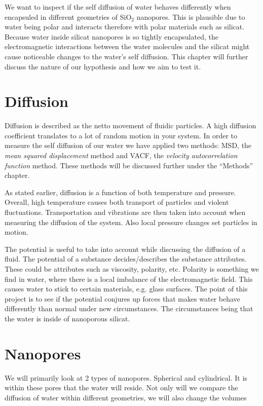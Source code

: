 \documentclass[10pt, a4paper]{report}
\begin{document}
We want to inspect if the self diffusion of water behaves differently
when encapsuled in different geometries of SiO$_2$ nanopores. This is plausible due to water being polar and interacts therefore with polar materials such as silicat. 
Because water inside silicat nanopores is so tightly encapsulated, the electromagnetic interactions between the water 
molecules and the silicat might cause noticeable changes to the water's self diffusion.
This chapter will further discuss the nature of our hypothesis and how we aim to test it.

\section{Diffusion}
Diffusion is described as the netto movement of fluidic particles. A high diffusion coefficient translates to a lot of random motion in your system.
In order to measure the self diffusion of our water we have applied two methods: MSD, the \emph{mean squared displacement} method and VACF, the \emph{velocity autocorrelation function} method.
These methods will be discussed further under the ``Methods'' chapter.

As stated earlier, diffusion is a function of both temperature and pressure. Overall, high temperature causes both transport of particles and violent fluctuations.
Transportation and vibrations are then taken into account when measuring the diffusion of the system. Also local pressure changes set particles in motion.

The potential is useful to take into account while discussing the diffusion of a fluid. The potential of a substance decides/describes the substance attributes. These could be attributes such as viscosity, polarity, etc.
Polarity is something we find in water, where there is a local imbalance of the electromagnetic field. This causes water to stick to certain materials, e.g. glass surfaces. The point of this project is to see if
the potential conjures up forces that makes water behave differently than normal under new circumstances. The circumstances being that the water is inside of nanoporous silicat.

\section{Nanopores}
We will primarily look at 2 types of nanopores. Spherical and cylindrical.
It is within these pores that the water will reside.
Not only will we compare the diffusion of water within different geometries, we will also change the volumes
\end{document}
